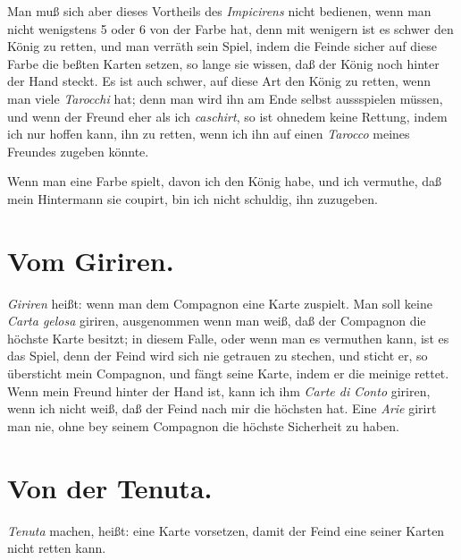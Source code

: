 \documentclass[11pt,a6paper,twoside]{article}
\begin{document}
Man muß sich aber dieses Vortheils des \textit{Impicirens} nicht bedienen, wenn man nicht wenigstens 5 oder 6 von der Farbe hat, denn mit wenigern ist es schwer den König zu retten, und man verräth sein Spiel, indem die Feinde sicher auf diese Farbe die beßten Karten setzen, so lange sie wissen, daß der König noch hinter der Hand steckt. Es ist auch schwer, auf diese Art den König zu retten, wenn man viele \textit{Tarocchi} hat; denn man wird ihn am Ende selbst aussspielen müssen, und wenn der Freund eher als ich \textit{caschirt}, so ist ohnedem keine Rettung, indem ich nur hoffen kann, ihn zu retten, wenn ich ihn auf einen \textit{Tarocco} meines Freundes zugeben könnte.

Wenn man eine Farbe spielt, davon ich den König habe, und ich vermuthe, daß mein Hintermann sie coupirt, bin ich nicht schuldig, ihn zuzugeben.

\section{Vom Giriren.}

\textit{Giriren} heißt: wenn man dem Compagnon eine Karte zuspielt. Man soll keine \textit{Carta gelosa} giriren, ausgenommen wenn man weiß, daß der Compagnon die höchste Karte besitzt; in diesem Falle, oder wenn man es vermuthen kann, ist es das Spiel, denn der Feind wird sich nie getrauen zu stechen, und sticht er, so übersticht mein Compagnon, und fängt seine Karte, indem er die meinige rettet. Wenn mein Freund hinter der Hand ist, kann ich ihm \textit{Carte di Conto} giriren, wenn ich nicht weiß, daß der Feind nach mir die höchsten hat. Eine \textit{Arie} girirt man nie, ohne bey seinem Compagnon die höchste Sicherheit zu haben.

\section{Von der Tenuta.}

\textit{Tenuta} machen, heißt: eine Karte vorsetzen, damit der Feind eine seiner Karten nicht retten kann.
\end{document}
